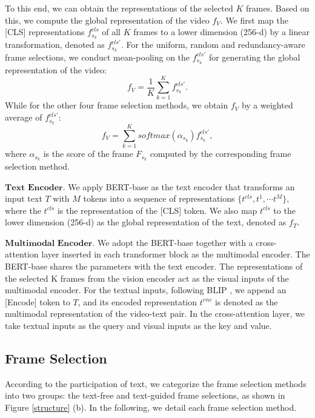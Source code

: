 \documentclass[11pt]{article}
\begin{document}
To this end, we can obtain the representations of the selected $K$ frames.
Based on this, we compute the global representation of the video $f_V$.
We first map the [CLS] representations $f^{cls}_{s_k}$ of all $K$ frames to a lower dimension (256-d) by a linear transformation, denoted as $f^{cls\prime}_{s_k}$.
For the uniform, random and redundancy-aware frame selections, we conduct mean-pooling on the $f^{cls\prime}_{s_k}$ for generating the global representation of the video:
\begin{equation}
f_V = \frac{1}{K}\sum_{k=1}^K f_{s_k}^{cls\prime}. 
\end{equation}
While for the other four frame selection methods, we obtain $f_V$ by a weighted average of $f^{cls\prime}_{s_k}$:
\begin{equation}
    f_V = \sum_{k=1}^K softmax(\alpha_{s_k})f_{s_k}^{cls\prime} \label{soft_agg},
\end{equation}
where $\alpha_{s_k}$ is the score of the frame $F_{s_k}$ computed by the corresponding frame selection method.

$\textbf{Text Encoder.}$ 
We apply BERT-base \cite{devlin2018bert} as the text encoder that transforms an input text $T$ with $M$ tokens into a sequence of representations $\{t^{cls}, t^1, \cdots t^M\}$, where the $t^{cls}$ is the representation of the [CLS] token.
We also map $t^{cls}$ to the lower dimension (256-d) as the global representation of the text, denoted as $f_T$.

$\textbf{Multimodal Encoder.}$ 
We adopt the BERT-base together with a cross-attention layer inserted in each transformer block as the multimodal encoder.
The BERT-base shares the parameters with the text encoder.
The representations of the selected K frames from the vision encoder act as the visual inputs of the multimodal encoder. 
For the textual inputs, following BLIP \cite{li2022blip}, we append an [Encode] token to $T$, and its encoded representation $t^{enc}$ is denoted as the multimodal representation of the video-text pair.
In the cross-attention layer, we take textual inputs as the query and visual inputs as the key and value.

\subsection{Frame Selection}
\label{details of frame selection}

According to the participation of text, we categorize the frame selection methods into two groups: the text-free and text-guided frame selections, as shown in Figure \ref{structure} (b).
In the following, we detail each frame selection method.
\end{document}
